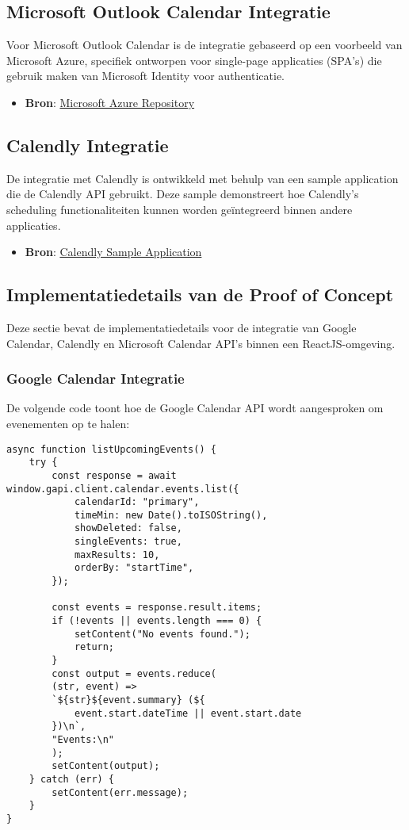 \subsection{Microsoft Outlook Calendar Integratie}
Voor Microsoft Outlook Calendar is de integratie gebaseerd op een voorbeeld van Microsoft Azure, specifiek ontworpen voor single-page applicaties (SPA's) die gebruik maken van Microsoft Identity voor authenticatie.
\begin{itemize}
    \item \textbf{Bron}: \href{https://github.com/Azure-Samples/ms-identity-docs-code-javascript/tree/main/react-spa}{Microsoft Azure Repository}
\end{itemize}

\subsection{Calendly Integratie}
De integratie met Calendly is ontwikkeld met behulp van een sample application die de Calendly API gebruikt. Deze sample demonstreert hoe Calendly's scheduling functionaliteiten kunnen worden geïntegreerd binnen andere applicaties.
\begin{itemize}
    \item \textbf{Bron}: \href{https://github.com/calendly/buzzwordcrm}{Calendly Sample Application}
\end{itemize}


\subsection{Implementatiedetails van de Proof of Concept}
Deze sectie bevat de implementatiedetails voor de integratie van Google Calendar, Calendly en Microsoft Calendar API's binnen een ReactJS-omgeving.

\subsubsection{Google Calendar Integratie}

De volgende code toont hoe de Google Calendar API wordt aangesproken om evenementen op te halen:

\begin{verbatim}    
async function listUpcomingEvents() {
    try {
        const response = await window.gapi.client.calendar.events.list({
            calendarId: "primary",
            timeMin: new Date().toISOString(),
            showDeleted: false,
            singleEvents: true,
            maxResults: 10,
            orderBy: "startTime",
        });
        
        const events = response.result.items;
        if (!events || events.length === 0) {
            setContent("No events found.");
            return;
        }
        const output = events.reduce(
        (str, event) =>
        `${str}${event.summary} (${
            event.start.dateTime || event.start.date
        })\n`,
        "Events:\n"
        );
        setContent(output);
    } catch (err) {
        setContent(err.message);
    }
}
\end{verbatim}

